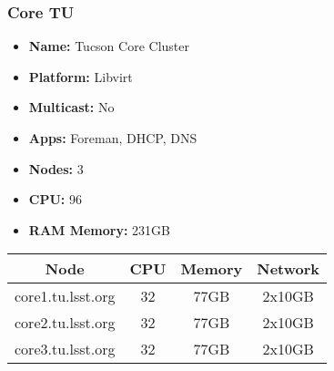 \subsubsection{Core TU}
\vspace*{-\baselineskip}
\begin{itemize}
  \itemsep0em 
  \item \textbf{Name:}       Tucson Core Cluster
  \item \textbf{Platform:}   Libvirt
  \item \textbf{Multicast:}  No
  \item \textbf{Apps:}       Foreman, DHCP, DNS
  \item \textbf{Nodes:}      3
  \item \textbf{CPU:}        96
  \item \textbf{RAM Memory:} 231GB
\end{itemize}
\vspace*{-\baselineskip}
\begin{center}
  \small
  \begin{tabular}{||c c c c||}
    \hline
    \textbf{Node} & \textbf{CPU} & \textbf{Memory} & \textbf{Network} \\ [0.5ex]
    \hline
    core1.tu.lsst.org & 32 & 77GB & 2x10GB \\
    \hline
    core2.tu.lsst.org & 32 & 77GB & 2x10GB \\
    \hline
    core3.tu.lsst.org & 32 & 77GB & 2x10GB \\
    \hline
  \end{tabular}
\end{center}